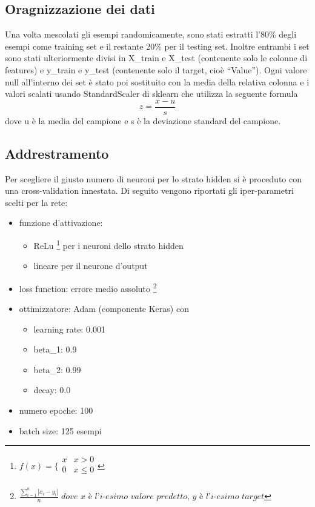\documentclass[12pt]{report}
\begin{document}
\subsection{Oragnizzazione dei dati}
Una volta mescolati gli esempi randomicamente, sono stati estratti l'80\% degli esempi come training set e il restante 20\% per il testing set. Inoltre entrambi i set sono stati ulteriormente divisi in X\_train e X\_test (contenente solo le colonne di features) e y\_train e y\_test (contenente solo il target, cioè “Value”). Ogni valore null all’interno dei set è stato poi sostituito con la media della relativa colonna e i valori scalati usando StandardScaler di sklearn che utilizza la seguente formula
$$z = \frac{x - u}{s}$$ 
dove u è la media del campione e s è la deviazione standard del campione.

\subsection{Addrestramento}
Per scegliere il giusto numero di neuroni per lo strato hidden si è proceduto con una cross-validation innestata. Di seguito vengono riportati gli iper-parametri scelti per la rete:
\begin{itemize}
\item{funzione d’attivazione}:

\begin{itemize}
\item{ReLu 
\footnote{$f(x) =
\bigg \{
\begin{array}{rl}
x & x > 0 \\
0 & x \leq 0 \\
\end{array}
$
} per i neuroni dello strato hidden}
\item{lineare per il neurone d'output}
\end{itemize}

\item{loss function}: errore medio assoluto \footnote{
$\displaystyle{\frac{\sum_{i=1}^n \left|x_i - y_i\right|}{n}} \; \textit{dove x è l'i-esimo valore predetto, y è l'i-esimo target}$
}

\item{ottimizzatore}: Adam (componente Keras) con

\begin{itemize}
\item{learning rate}: 0.001
\item{beta\_1}: 0.9
\item{beta\_2}: 0.99
\item{decay}: 0.0
\end{itemize}

\item{numero epoche}: 100

\item{batch size}: 125 esempi
\end{itemize}
\end{document}
